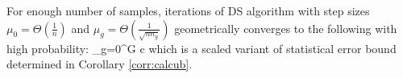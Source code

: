 \begin{corollary}
	\label{corr:show}
	For enough number of samples, iterations of DS algorithm with step sizes $\mu_0 = \Theta(\frac{1}{n})$ and $\mu_g =  \Theta(\frac{1}{\sqrt{n n_g}})$ geometrically converges to the following with high probability:
	{\small\be
	\label{eq:scaled}
	\sum_{g=0}^{G}  
	\leq c 
	\ee}
	which is a scaled variant of statistical error bound determined in Corollary \ref{corr:calcub}.
\end{corollary}
%
%

